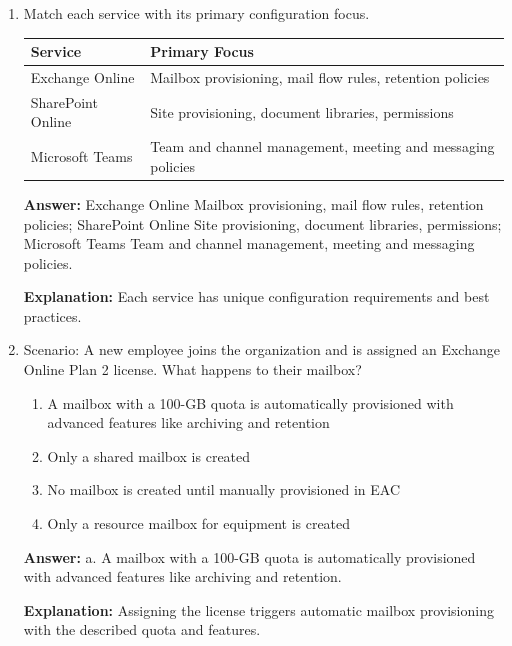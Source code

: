 \documentclass[10pt]{article}
\begin{document}
\begin{enumerate}[leftmargin=*]
\textbf{Explanation:} This provides quick access to resources and dashboards while connectors pull updates from external services.

\item Match each service with its primary configuration focus.

\begin{center}
\begin{tabular}{>{\raggedright\arraybackslash}p{} >{\raggedright\arraybackslash}p{}}
\toprule
\textbf{Service} & \textbf{Primary Focus} \\
\midrule
Exchange Online & Mailbox provisioning, mail flow rules, retention policies \\
SharePoint Online & Site provisioning, document libraries, permissions \\
Microsoft Teams & Team and channel management, meeting and messaging policies \\
\bottomrule
\end{tabular}
\end{center}

\textbf{Answer:} Exchange Online \textrightarrow{} Mailbox provisioning, mail flow rules, retention policies; SharePoint Online \textrightarrow{} Site provisioning, document libraries, permissions; Microsoft Teams \textrightarrow{} Team and channel management, meeting and messaging policies.

\textbf{Explanation:} Each service has unique configuration requirements and best practices.

\item Scenario: A new employee joins the organization and is assigned an Exchange Online Plan 2 license. What happens to their mailbox?
\begin{enumerate}[label=\alph*., leftmargin=1.5em]
\item A mailbox with a 100-GB quota is automatically provisioned with advanced features like archiving and retention
\item Only a shared mailbox is created
\item No mailbox is created until manually provisioned in EAC
\item Only a resource mailbox for equipment is created
\end{enumerate}
\textbf{Answer:} a. A mailbox with a 100-GB quota is automatically provisioned with advanced features like archiving and retention.

\textbf{Explanation:} Assigning the license triggers automatic mailbox provisioning with the described quota and features.


\end{enumerate}
\end{document}
